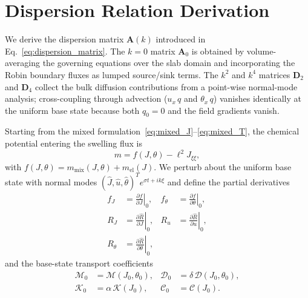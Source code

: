 \documentclass[aps,pre,reprint,superscriptaddress,longbibliography,floatfix]{revtex4-2}
\newcommand{\Ms}{\mathcal{M}}
\newcommand{\Ds}{\mathcal{D}}
\newcommand{\Cs}{\mathcal{C}}
\newcommand{\Ks}{\mathcal{K}}
\newcommand{\Rhat}{\widehat{R}}
\begin{document}
\section{Dispersion Relation Derivation}
\label{app:lsa}

We derive the dispersion matrix $\mathbf A(k)$ introduced in
Eq.~\eqref{eq:dispersion_matrix}.  The $k=0$ matrix $\mathbf A_0$
is obtained by volume-averaging the governing equations over the slab
domain and incorporating the Robin boundary fluxes as lumped
source/sink terms.  The $k^2$ and $k^4$ matrices $\mathbf D_2$ and
$\mathbf D_4$ collect the bulk diffusion contributions from a
point-wise normal-mode analysis; cross-coupling through advection
($u_x\,q$ and $\theta_x\,q$) vanishes identically at the uniform
base state because both $q_0=0$ and the field gradients vanish.

Starting from the mixed
formulation~\eqref{eq:mixed_J}--\eqref{eq:mixed_T}, the chemical
potential entering the swelling flux is
\begin{equation}
  m = f(J,\theta) - \ell^2 J_{\xi\xi},
\end{equation}
with $f(J,\theta)=m_\mathrm{mix}(J,\theta)+m_\mathrm{el}(J)$.
We perturb about the uniform base state with normal modes
$(\widehat J,\widehat u,\widehat\theta)^T e^{\sigma t+ik\xi}$
and define the partial derivatives
\begin{subequations}
\begin{align}
  f_J &= \left.\frac{\partial f}{\partial J}\right|_0, &
  f_\theta &= \left.\frac{\partial f}{\partial \theta}\right|_0,
  \\
  R_J &= \left.\frac{\partial \Rhat}{\partial J}\right|_0, &
  R_u &= \left.\frac{\partial \Rhat}{\partial u}\right|_0,
  \\
  R_\theta &= \left.\frac{\partial \Rhat}{\partial \theta}\right|_0,
\end{align}
\end{subequations}
and the base-state transport coefficients
\begin{subequations}
\begin{align}
  \Ms_0 &= \Ms(J_0,\theta_0), &
  \Ds_0 &= \delta\,\Ds(J_0,\theta_0),
  \\
  \Ks_0 &= \alpha\,\Ks(J_0), &
  \Cs_0 &= \Cs(J_0).
\end{align}
\end{subequations}
\end{document}

